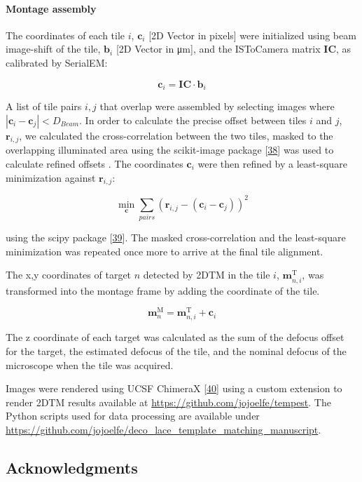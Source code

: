 \documentclass[
]{article}
\begin{document}
\hypertarget{montage-assembly}{%
\paragraph{Montage assembly}\label{montage-assembly}}

The coordinates of each tile \(i\), \(\mathbf{c}_{i}\) {[}2D Vector in
pixels{]} were initialized using beam image-shift of the tile,
\(\mathbf{b}_i\) {[}2D Vector in μm{]}, and the ISToCamera matrix
\(\mathbf{IC}\), as calibrated by SerialEM:

\[\mathbf{c}_{i} = \mathbf{IC} \cdot \mathbf{b}_i\]

A list of tile pairs \(i,j\) that overlap were assembled by selecting
images where \(|\mathbf{c}_i-\mathbf{c}_j| < D_{Beam}\). In order to
calculate the precise offset between tiles \(i\) and \(j\),
\(\mathbf{r}_{i,j}\), we calculated the cross-correlation between the two
tiles, masked to the overlapping illuminated area using the scikit-image
package {[}\protect\hyperlink{ref-stvWEJeu}{38}{]} was used to calculate refined offsets .
The coordinates \(\mathbf{c}_{i}\) were then refined by a least-square
minimization against \(\mathbf{r}_{i,j}\):

\[ \displaystyle{\min_{\mathbf{c}} \sum_{pairs}{(\mathbf{r}_{i,j} - (\mathbf{c}_i-\mathbf{c}_j))^2}}\]

using the scipy package {[}\protect\hyperlink{ref-8Miti2Gz}{39}{]}. The masked
cross-correlation and the least-square minimization was repeated once
more to arrive at the final tile alignment.

The x,y coordinates of target \(n\) detected by 2DTM in the tile \(i\),
\(\textbf{m}^\textrm{T}_{n,i}\), was transformed into the montage frame by
adding the coordinate of the tile.

\[ \textbf{m}^\textrm{M}_n = \textbf{m}^\textrm{T}_{n,i} + \textbf{c}_i\]

The z coordinate of each target was calculated as the sum of the defocus
offset for the target, the estimated defocus of the tile, and the
nominal defocus of the microscope when the tile was acquired.

Images were rendered using UCSF ChimeraX {[}\protect\hyperlink{ref-cYCuuZxG}{40}{]} using a
custom extension to render 2DTM results available at
\url{https://github.com/jojoelfe/tempest}. The Python scripts used for data
processing are available under
\url{https://github.com/jojoelfe/deco_lace_template_matching_manuscript}.

\hypertarget{acknowledgments}{%
\subsection{Acknowledgments}\label{acknowledgments}}
\end{document}
